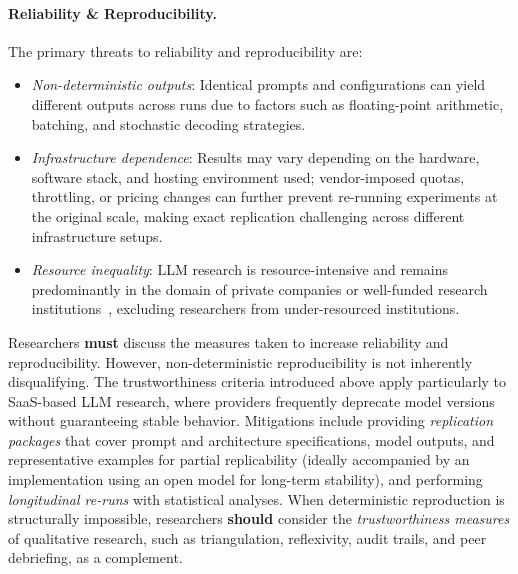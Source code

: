 \documentclass[smallextended]{svjour3}
\newcommand{\must}{\textbf{must}\xspace}
\newcommand{\should}{\textbf{should}\xspace}
\newcommand{\guidelineparagraph}[1]{\paragraph{#1.}}
\newcommand{\guidelineparagraph}[1]{\paragraph{#1}}
\begin{document}
\guidelineparagraph{Reliability \& Reproducibility}
The primary threats to reliability and reproducibility are:
\begin{itemize}
    \item \emph{Non-deterministic outputs}: Identical prompts and configurations can yield different outputs across runs due to factors such as floating-point arithmetic, batching, and stochastic decoding strategies.
    \item \emph{Infrastructure dependence}: Results may vary depending on the hardware, software stack, and hosting environment used; vendor-imposed quotas, throttling, or pricing changes can further prevent re-running experiments at the original scale, making exact replication challenging across different infrastructure setups.
    \item \emph{Resource inequality}: LLM research is resource-intensive and remains predominantly in the domain of private companies or well-funded research institutions~\cite{schwartz2020green, ahmed2023industry}, excluding researchers from under-resourced institutions.
\end{itemize}

Researchers \must discuss the measures taken to increase reliability and reproducibility.
However, non-deterministic reproducibility is not inherently disqualifying. The trustworthiness criteria introduced above apply particularly to SaaS-based LLM research, where providers frequently deprecate model versions without guaranteeing stable behavior.
Mitigations include providing \emph{replication packages} that cover prompt and architecture specifications, model outputs, and representative examples for partial replicability (ideally accompanied by an implementation using an open model for long-term stability), and performing \emph{longitudinal re-runs} with statistical analyses. When deterministic reproduction is structurally impossible, researchers \should consider the \emph{trustworthiness measures} of qualitative research, such as triangulation, reflexivity, audit trails, and peer debriefing, as a complement.
\end{document}
